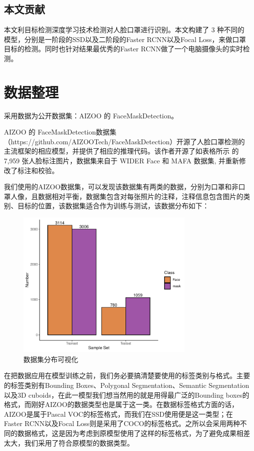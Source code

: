 \documentclass[journal,transmag]{IEEEtran}
\begin{document}
\subsection{本文贡献}
本文利目标检测深度学习技术检测对人脸口罩进行识别。本文构建了 3 种不同的模型，分别是一阶段的SSD以及二阶段的Faster RCNN以及Focal Loss，来做口罩目标的检测。同时也针对结果最优秀的Faster RCNN做了一个电脑摄像头的实时检测。

\section{数据整理}
采用数据为公开数据集：AIZOO 的 FaceMaskDetection。

AIZOO 的 FaceMaskDetection数据集（https://github.com/AIZOOTech/FaceMaskDetection）开源了人脸口罩检测的主流框架的相应模型，并提供了相应的推理代码。该作者开源了如表格所示 的 7,959 张人脸标注图片，数据集来自于 WIDER Face 和 MAFA 数据集, 并重新修改了标注和校验。

我们使用的AIZOO数据集，可以发现该数据集有两类的数据，分别为口罩和非口罩人像，且数据相对平衡，数据集包含对每张照片的注释，注释信息包含图片的类别、目标的位置，该数据集适合作为训练与测试，该数据分布如下：
\begin{figure}[h]
\centering
\includegraphics[width=3.44in]{Dataset.pdf}
\caption{数据集分布可视化}
\end{figure}

在把数据应用在模型训练之前，我们务必要搞清楚要使用的标签类别与格式。主要的标签类别有Bounding Boxes、Polygonal Segmentation、Semantic Segmentation以及3D cuboids，在此一模型我们想当然用的就是用得最广泛的Bounding boxes的格式，而刚好AIZOO的数据类型也是属于这一类。在数据标签格式方面的话，AIZOO是属于Pascal VOC的标签格式，而我们在SSD使用便是这一类型；在Faster RCNN以及Focal Loss则是采用了COCO的标签格式。之所以会采用两种不同的数据格式，这是因为考虑到原模型使用了这样的标签格式，为了避免成果相差太大，我们采用了符合原模型的数据类型。
\end{document}
